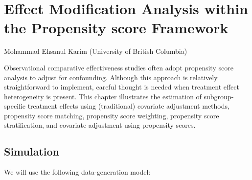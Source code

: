 \documentclass[
  letterpaper,
  DIV=11,
  numbers=noendperiod]{scrreprt}
\begin{document}


\hypertarget{effect-modification-analysis-within-the-propensity-score-framework}{%
\chapter{Effect Modification Analysis within the Propensity score
Framework}\label{effect-modification-analysis-within-the-propensity-score-framework}}

Mohammad Ehsanul Karim (University of British Columbia)

\hfill\break

Observational comparative effectiveness studies often adopt propensity
score analysis to adjust for confounding. Although this approach is
relatively straightforward to implement, careful thought is needed when
treatment effect heterogeneity is present. This chapter illustrates the
estimation of subgroup-specific treatment effects using (traditional)
covariate adjustment methods, propensity score matching, propensity
score weighting, propensity score stratification, and covariate
adjustment using propensity scores.

\hypertarget{simulation}{%
\section{Simulation}\label{simulation}}

We will use the following data-generation model:
\end{document}
